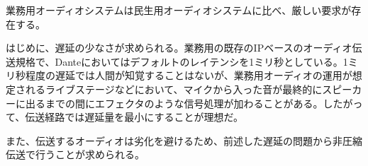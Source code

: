 業務用オーディオシステムは民生用オーディオシステムに比べ、厳しい要求が存在する。

はじめに、遅延の少なさが求められる。業務用の既存のIPベースのオーディオ伝送規格で、Danteにおいてはデフォルトのレイテンシを1ミリ秒としている。1ミリ秒程度の遅延では人間が知覚することはないが、業務用オーディオの運用が想定されるライブステージなどにおいて、マイクから入った音が最終的にスピーカーに出るまでの間にエフェクタのような信号処理が加わることがある。したがって、伝送経路では遅延量を最小にすることが理想だ。

また、伝送するオーディオは劣化を避けるため、前述した遅延の問題から非圧縮伝送で行うことが求められる。
